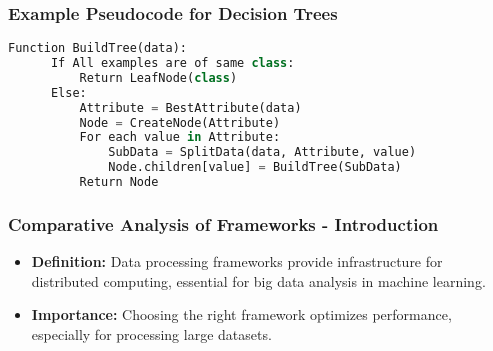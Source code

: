 \documentclass[aspectratio=169]{beamer}
\begin{document}
\begin{frame}[fragile]
  \frametitle{Example Pseudocode for Decision Trees}
  
  \begin{lstlisting}[language=Python]
  Function BuildTree(data):
      If All examples are of same class:
          Return LeafNode(class)
      Else:
          Attribute = BestAttribute(data)
          Node = CreateNode(Attribute)
          For each value in Attribute:
              SubData = SplitData(data, Attribute, value)
              Node.children[value] = BuildTree(SubData)
          Return Node
  \end{lstlisting}
\end{frame}

\begin{frame}[fragile]
    \frametitle{Comparative Analysis of Frameworks - Introduction}
    \begin{itemize}
        \item \textbf{Definition:} Data processing frameworks provide infrastructure for distributed computing, essential for big data analysis in machine learning.
        \item \textbf{Importance:} Choosing the right framework optimizes performance, especially for processing large datasets.
    \end{itemize}
\end{frame}
\end{document}
